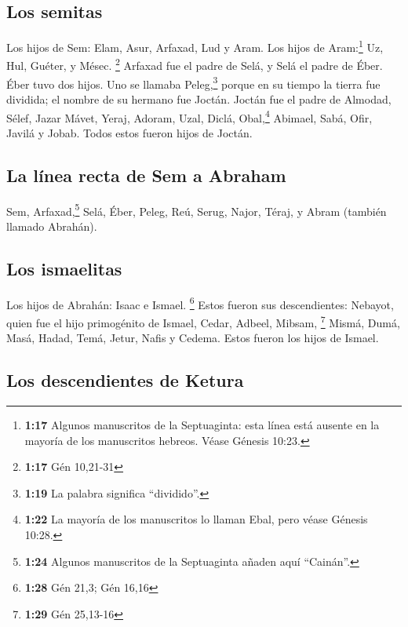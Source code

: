 \hypertarget{los-semitas}{%
\subsection{Los semitas}\label{los-semitas}}

 Los hijos de Sem: Elam, Asur, Arfaxad, Lud y Aram. Los
hijos de Aram:\footnote{\textbf{1:17} Algunos manuscritos de la
  Septuaginta: esta línea está ausente en la mayoría de los manuscritos
  hebreos. Véase Génesis 10:23.} Uz, Hul, Guéter, y Mésec. \footnote{\textbf{1:17}
  Gén 10,21-31}  Arfaxad fue el padre de Selá, y Selá el
padre de Éber.  Éber tuvo dos hijos. Uno se llamaba
Peleg,\footnote{\textbf{1:19} La palabra significa ``dividido''.} porque
en su tiempo la tierra fue dividida; el nombre de su hermano fue Joctán.
 Joctán fue el padre de Almodad, Sélef, Jazar Mávet,
Yeraj,  Adoram, Uzal, Diclá, 
Obal,\footnote{\textbf{1:22} La mayoría de los manuscritos lo llaman
  Ebal, pero véase Génesis 10:28.} Abimael, Sabá,  Ofir,
Javilá y Jobab. Todos estos fueron hijos de Joctán.

\hypertarget{la-luxednea-recta-de-sem-a-abraham}{%
\subsection{La línea recta de Sem a
Abraham}\label{la-luxednea-recta-de-sem-a-abraham}}

 Sem, Arfaxad,\footnote{\textbf{1:24} Algunos manuscritos
  de la Septuaginta añaden aquí ``Cainán''.} Selá,  Éber,
Peleg, Reú,  Serug, Najor, Téraj,  y Abram
(también llamado Abrahán).

\hypertarget{los-ismaelitas}{%
\subsection{Los ismaelitas}\label{los-ismaelitas}}

 Los hijos de Abrahán: Isaac e Ismael. \footnote{\textbf{1:28}
  Gén 21,3; Gén 16,16}  Estos fueron sus descendientes:
Nebayot, quien fue el hijo primogénito de Ismael, Cedar, Adbeel, Mibsam,
\footnote{\textbf{1:29} Gén 25,13-16}  Mismá, Dumá, Masá,
Hadad, Temá,  Jetur, Nafis y Cedema. Estos fueron los
hijos de Ismael.

\hypertarget{los-descendientes-de-ketura}{%
\subsection{Los descendientes de
Ketura}\label{los-descendientes-de-ketura}}

